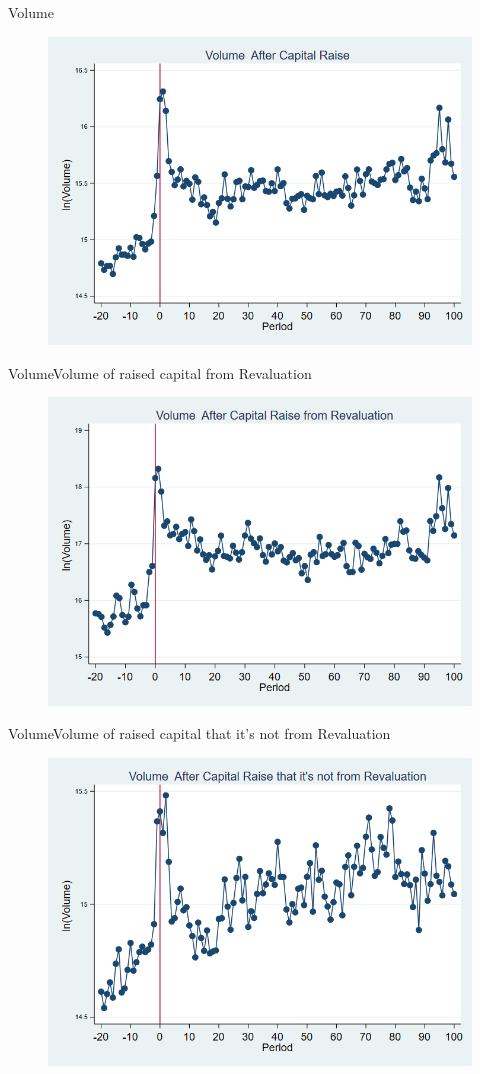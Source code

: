 \documentclass{beamer}
\begin{document}
\begin{frame}{Volume}
\begin{figure}
\centering
\includegraphics[width=0.7\linewidth]{volume}
\label{fig:volume}
\end{figure}
\end{frame}


\begin{frame}{Volume}{Volume of raised capital from Revaluation}
\begin{figure}
\centering
\includegraphics[width=0.7\linewidth]{volume_Revaluation}
\label{fig:volumerevaluation}
\end{figure}
\end{frame}


\begin{frame}{Volume}{Volume of raised capital that it's not from Revaluation}
\begin{figure}
\centering
\includegraphics[width=0.7\linewidth]{volume_NoRevaluation}
\label{fig:volumenorevaluation}
\end{figure}
\end{frame}
\end{document}
